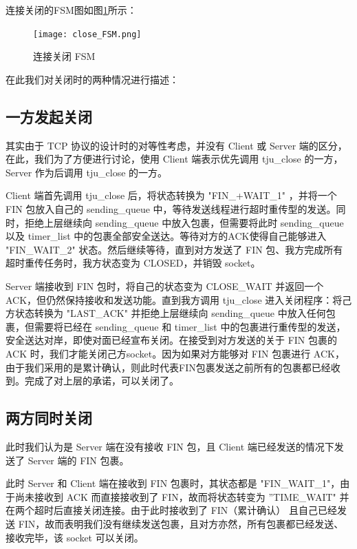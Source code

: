 连接关闭的FSM图如图\ref{fig:close_fsm}所示：

\begin{figure}[!htbp]
    \centering
    \texttt{[image: close\_FSM.png]}
    \label{fig:close_fsm}\caption{连接关闭 FSM}
  \end{figure}

在此我们对关闭时的两种情况进行描述：

\subsection*{一方发起关闭}

其实由于 TCP 协议的设计时的对等性考虑，并没有 Client 或 Server 端的区分，在此，我们为了方便进行讨论，使用 Client 端表示优先调用 tju\_close 的一方，Server 作为后调用 tju\_close 的一方。

Client 端首先调用 tju\_close 后，将状态转换为 "FIN\_+WAIT\_1" ，并将一个 FIN 包放入自己的 sending\_queue 中，等待发送线程进行超时重传型的发送。同时，拒绝上层继续向 sending\_queue 中放入包裹，但需要将此时 sending\_queue 以及 timer\_list 中的包裹全部安全送达。等待对方的ACK使得自己能够进入 "FIN\_WAIT\_2" 状态。然后继续等待，直到对方发送了 FIN 包、我方完成所有超时重传任务时，我方状态变为 CLOSED，并销毁 socket。

Server 端接收到 FIN 包时，将自己的状态变为 CLOSE\_WAIT 并返回一个 ACK，但仍然保持接收和发送功能。直到我方调用 tju\_close 进入关闭程序：将己方状态转换为 "LAST\_ACK" 并拒绝上层继续向 sending\_queue 中放入任何包裹，但需要将已经在 sending\_queue 和 timer\_list 中的包裹进行重传型的发送，安全送达对岸，即使对面已经宣布关闭。在接受到对方发送的关于 FIN 包裹的 ACK 时，我们才能关闭己方socket。因为如果对方能够对 FIN 包裹进行 ACK，由于我们采用的是累计确认，则此时代表FIN包裹发送之前所有的包裹都已经收到。完成了对上层的承诺，可以关闭了。

\subsection*{两方同时关闭}

此时我们认为是 Server 端在没有接收 FIN 包，且 Client 端已经发送的情况下发送了 Server 端的 FIN 包裹。

此时 Server 和 Client 端在接收到 FIN 包裹时，其状态都是 "FIN\_WAIT\_1"，由于尚未接收到 ACK 而直接接收到了 FIN，故而将状态转变为 ”TIME\_WAIT" 并在两个超时后直接关闭连接。由于此时接收到了 FIN（累计确认） 且自己已经发送 FIN，故而表明我们没有继续发送包裹，且对方亦然，所有包裹都已经发送、接收完毕，该 socket 可以关闭。

